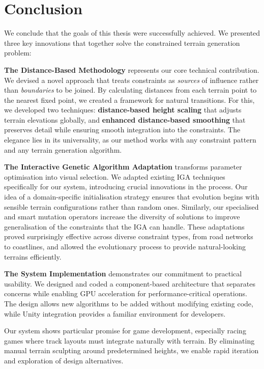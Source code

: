 \chapter*{Conclusion}
\label{epilog}

We conclude that the goals of this thesis were successfully achieved. We presented three key innovations that together solve the constrained terrain generation problem:

\textbf{The Distance-Based Methodology} represents our core technical contribution. We devised a novel approach that treats constraints as \textit{sources} of influence rather than \textit{boundaries} to be joined. By calculating distances from each terrain point to the nearest fixed point, we created a framework for natural transitions. For this, we developed two techniques: \textbf{distance-based height scaling} that adjusts terrain elevations globally, and \textbf{enhanced distance-based smoothing} that preserves detail while ensuring smooth integration into the constraints. The elegance lies in its universality, as our method works with any constraint pattern and any terrain generation algorithm.

\textbf{The Interactive Genetic Algorithm Adaptation} transforms parameter optimisation into visual selection. We adapted existing IGA techniques specifically for our system, introducing crucial innovations in the process. Our idea of a domain-specific initialisation strategy ensures that evolution begins with sensible terrain configurations rather than random ones. Similarly, our specialised and smart mutation operators increase the diversity of solutions to improve generalisation of the constraints that the IGA can handle. These adaptations proved surprisingly effective across diverse constraint types, from road networks to coastlines, and allowed the evolutionary process to provide natural-looking terrains efficiently.

\textbf{The System Implementation} demonstrates our commitment to practical usability. We designed and coded a component-based architecture that separates concerns while enabling GPU acceleration for performance-critical operations. The design allows new algorithms to be added without modifying existing code, while Unity integration provides a familiar environment for developers.

Our system shows particular promise for game development, especially racing games where track layouts must integrate naturally with terrain. By eliminating manual terrain sculpting around predetermined heights, we enable rapid iteration and exploration of design alternatives.

